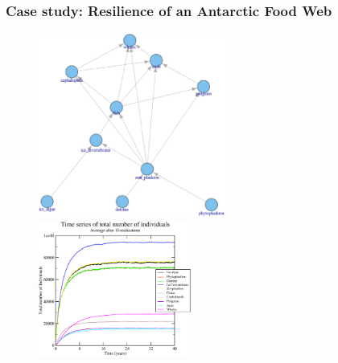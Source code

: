 \documentclass[xcolor=x11names,compress]{beamer}
\renewcommand{\(}{\begin{columns}}
\renewcommand{\)}{\end{columns}}
\newcommand{\<}[1]{\begin{column}{#1}}
\renewcommand{\>}{\end{column}}
\begin{document}
\begin{frame}
\frametitle{Case study: Resilience of an Antarctic Food Web}
\begin{figure}
 \includegraphics[width=0.55\textwidth]{./figures/antfigures/Antarctic_fweb.eps} 
 \includegraphics[width=0.45\textwidth]{./figures/antfigures/ant_control.eps}
\end{figure}
\end{frame}
\end{document}
